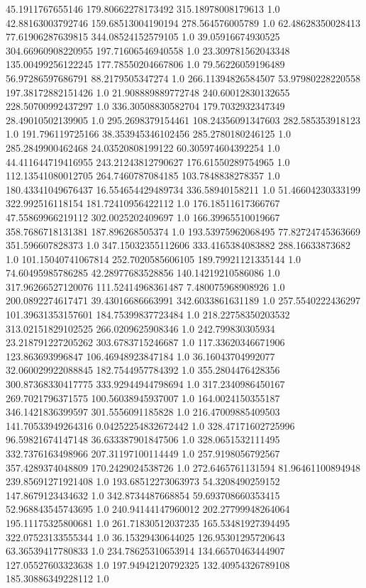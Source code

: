 45.1911767655146	179.80662278173492	315.18978008179613	1.0
42.88163003792746	159.68513004190194	278.564576005789	1.0
62.48628350028413	77.61906287639815	344.08524152579105	1.0
39.05916674930525	304.66960908220955	197.71606546940558	1.0
23.309781562043348	135.00499256122245	177.78550204667806	1.0
79.56226059196489	56.97286597686791	88.2179505347274	1.0
266.11394826584507	53.97980228220558	197.38172882151426	1.0
21.908889889772748	240.60012830132655	228.50700992437297	1.0
336.30508830582704	179.7032932347349	28.49010502139905	1.0
295.2698379154461	108.24356091347603	282.585353918123	1.0
191.796119725166	38.353945346102456	285.2780180246125	1.0
285.2849900462468	24.03520808199122	60.305974604392254	1.0
44.411644719416955	243.21243812790627	176.61550289754965	1.0
112.13541080012705	264.7460787084185	103.7848838278357	1.0
180.43341049676437	16.554654429489734	336.58940158211	1.0
51.46604230333199	322.992516118154	181.72410956422112	1.0
176.18511617366767	47.55869966219112	302.0025202409697	1.0
166.39965510019667	358.7686718131381	187.896268505374	1.0
193.53975962068495	77.82724745363669	351.596607828373	1.0
347.15032355112606	333.4165384083882	288.16633873682	1.0
101.15040741067814	252.7020585606105	189.79921121335144	1.0
74.60495985786285	42.28977683528856	140.14219210586086	1.0
317.96266527120076	111.52414968361487	7.480075968908926	1.0
200.0892274617471	39.43016686663991	342.6033861631189	1.0
257.5540222436297	101.39631353157601	184.75399837723484	1.0
218.22758350203532	313.02151829102525	266.0209625908346	1.0
242.799830305934	23.218791227205262	303.6783715246687	1.0
117.33620346671906	123.863693996847	106.46948923847184	1.0
36.16043704992077	32.060029922088845	182.7544957784392	1.0
355.2804476428356	300.87368330417775	333.92944944798694	1.0
317.2340986450167	269.7021796371575	100.56038945937007	1.0
164.0024150355187	346.1421836399597	301.5556091185828	1.0
216.47009885409503	141.70533949264316	0.04252254832672442	1.0
328.47171602725996	96.59821674147148	36.633387901847506	1.0
328.0651532111495	332.7376163498966	207.31197100114449	1.0
257.9198056792567	357.4289374048809	170.2429024538726	1.0
272.6465761131594	81.96461100894948	239.85691271921408	1.0
193.68512273063973	54.3208490259152	147.8679123434632	1.0
342.8734487668854	59.693708660353415	52.968843545743695	1.0
240.94144147960012	202.27799948264064	195.11175325800681	1.0
261.71830512037235	165.53481927394495	322.07523133555344	1.0
36.15329430644025	126.95301295720643	63.36539417780833	1.0
234.78625310653914	134.66570463444907	127.05527603323638	1.0
197.94942120792325	132.40954326789108	185.30886349228112	1.0

